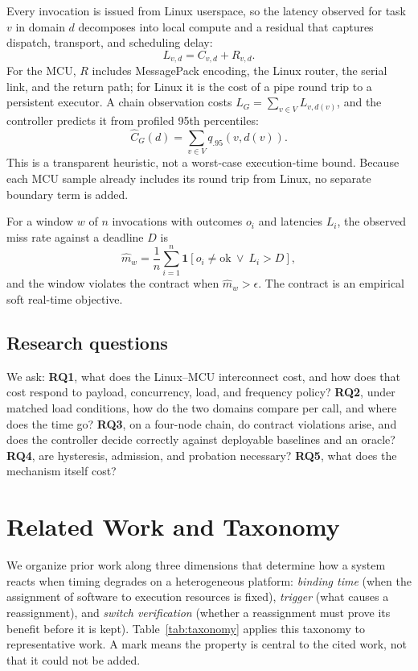 \documentclass[conference]{IEEEtran}
\begin{document}
Every invocation is issued from Linux userspace, so the latency observed for
task $v$ in domain $d$ decomposes into local compute and a residual that
captures dispatch, transport, and scheduling delay:
\begin{equation}
  L_{v,d} = C_{v,d} + R_{v,d}.
  \label{eq:decomposition}
\end{equation}
For the MCU, $R$ includes MessagePack encoding, the Linux router, the serial
link, and the return path; for Linux it is the cost of a pipe round trip to a
persistent executor. A chain observation costs
$L_G=\sum_{v\in V} L_{v,d(v)}$, and the controller predicts it from profiled
95th percentiles:
\begin{equation}
  \widehat{C}_G(d) = \sum_{v\in V} q_{.95}(v,d(v)).
  \label{eq:cost}
\end{equation}
This is a transparent heuristic, not a worst-case execution-time bound.
Because each MCU sample already includes its round trip from Linux, no
separate boundary term is added.

For a window $w$ of $n$ invocations with outcomes $o_i$ and latencies $L_i$,
the observed miss rate against a deadline $D$ is
\begin{equation}
  \widehat{m}_w=\frac{1}{n}\sum_{i=1}^{n}
  \mathbf{1}\!\left[o_i\ne\mathrm{ok}\ \lor\ L_i>D\right],
  \label{eq:miss}
\end{equation}
and the window violates the contract when $\widehat{m}_w>\epsilon$. The
contract is an empirical soft real-time objective.

\subsection{Research questions}
We ask: \textbf{RQ1}, what does the Linux--MCU interconnect cost, and how does
that cost respond to payload, concurrency, load, and frequency policy?
\textbf{RQ2}, under matched load conditions, how do the two domains compare
per call, and where does the time go? \textbf{RQ3}, on a four-node chain, do
contract violations arise, and does the controller decide correctly against
deployable baselines and an oracle? \textbf{RQ4}, are hysteresis, admission,
and probation necessary? \textbf{RQ5}, what does the mechanism itself cost?

\section{Related Work and Taxonomy}
\label{sec:related}
We organize prior work along three dimensions that determine how a system
reacts when timing degrades on a heterogeneous platform: \emph{binding time}
(when the assignment of software to execution resources is fixed),
\emph{trigger} (what causes a reassignment), and \emph{switch verification}
(whether a reassignment must prove its benefit before it is kept).
Table~\ref{tab:taxonomy} applies this taxonomy to representative work. A mark
means the property is central to the cited work, not that it could not be
added.
\end{document}

